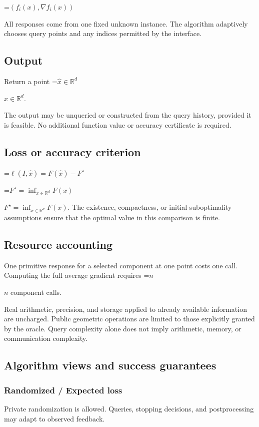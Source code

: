 \documentclass[10pt,a4paper]{article}
\newcommand{\AtlasMath}[1]{\par\begingroup\centering\setbox0=\hbox{$\displaystyle #1$}\ifdim\wd0>1.4\linewidth\typeout{ATLAS WIDE FORMULA: \the\wd0}\fi\ifdim\wd0>\linewidth\resizebox{\linewidth}{!}{\box0}\else\box0\fi\par\endgroup}
\newcommand{\AtlasInlineMath}[1]{\begingroup\setbox0=\hbox{$#1$}\ifdim\wd0>.4\linewidth\endgroup\AtlasMath{#1}\else\endgroup$#1$\fi}
\begin{document}
\AtlasMath{(f_i(x),\nabla f_i(x))}


All responses come from one fixed unknown instance. The algorithm adaptively chooses query points and any indices permitted by the interface.

\subsection{Output}
Return a point \AtlasInlineMath{\widehat x\in\mathbb R^d}.

The output may be unqueried or constructed from the query history, provided it is feasible. No additional function value or accuracy certificate is required.

\subsection{Loss or accuracy criterion}

\AtlasMath{\ell(I,\widehat{x})=F(\widehat{x})-F^\star}


\AtlasInlineMath{F^\star=\inf_{x\in \mathbb{R}^d}F(x)}. The existence, compactness, or initial-suboptimality assumptions ensure that the optimal value in this comparison is finite.

\subsection{Resource accounting}
One primitive response for a selected component at one point costs one call. Computing the full average gradient requires \AtlasInlineMath{n} component calls.

Real arithmetic, precision, and storage applied to already available information are uncharged. Public geometric operations are limited to those explicitly granted by the oracle. Query complexity alone does not imply arithmetic, memory, or communication complexity.

\subsection{Algorithm views and success guarantees}
\subsubsection{Randomized / Expected loss}
Private randomization is allowed. Queries, stopping decisions, and postprocessing may adapt to observed feedback.
\end{document}
